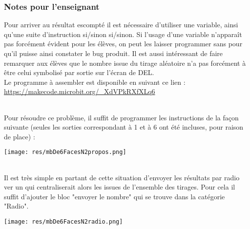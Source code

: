 \newpage
\subsubsection{Notes pour l'enseignant}

Pour arriver au résultat escompté il est nécessaire d'utiliser une variable, ainsi qu'une suite 
d'instruction si/sinon si/sinon. Si l'usage d'une variable n'apparaît pas forcément évident pour les élèves, 
on peut les laisser programmer sans pour qu'il puisse ainsi constater le bug produit.
Il est aussi intéressant de faire remarquer aux élèves que le nombre issue du tirage aléatoire 
n'a pas forcément à être celui symbolisé par sortie sur l'écran de DEL.\\
Le programme à assembler est disponible en suivant ce lien :
~\\ \url{https://makecode.microbit.org/_XdVPkRXfXLq6}

\begin{minipage}[t]{0.5\linewidth}
    \begin{methode}~\\
    Pour résoudre ce problème, il suffit de programmer les instructions de la façon suivante (seules les sorties correspondant à 1 et à 6 ont été incluses, pour raison de place) :
    
    \texttt{[image: res/mbDe6FacesN2propos.png]}
    \end{methode}
\end{minipage}
\hfill
\begin{minipage}[t]{0.5\linewidth}
    \begin{remarque}~\\
    Il est très simple en partant de cette situation d'envoyer les résultats par radio ver un \mb qui centraliserait alors les issues de l'ensemble des tirages. Pour cela il suffit d'ajouter le bloc "envoyer le nombre" qui se trouve dans la catégorie "Radio".
    
    \texttt{[image: res/mbDe6FacesN2radio.png]}
    
    \end{remarque}
\end{minipage}
